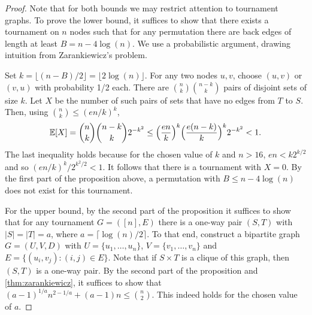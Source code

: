 \begin{proof}
    Note that for both bounds we may restrict attention to tournament graphs.
    To prove the lower bound, it suffices to show that there exists a tournament on $n$ nodes such that for any permutation there are back edges of length at least $B = n - 4\log(n)$.
    We use a probabilistic argument, drawing intuition from Zarankiewicz's problem.

    Set $k = \lfloor (n - B) / 2 \rfloor = \lfloor 2\log(n) \rfloor$.
    For any two nodes $u, v$, choose $(u, v)$ or $(v, u)$ with probability 1/2 each.
    There are $\binom{n}{k} \binom{n - k}{k}$ pairs of disjoint sets of size $k$.
    Let $X$ be the number of such pairs of sets that have no edges from $T$ to
    $S$.
    Then, using $\binom{n}{k} \le (en / k)^k$,
    \[ \mathbb{E}[X] =\binom{n}{k} \binom{n - k}{k}2^{-k^2} \le\Bigl( \frac{en}{k} \Bigr)^{k} \Bigl( \frac{e(n - k)}{k} \Bigr)^{k}2^{-k^2} < 1. \]
    The last inequality holds because for the chosen value of $k$ and $n > 16$, $en < k 2^{k / 2}$ and so $(en / k)^k / 2^{k^2 / 2} < 1$.
    It follows that there is a tournament with $X = 0$.
    By the first part of the proposition above, a permutation with $B \le n - 4\log(n)$ does not exist for this tournament.

    For the upper bound, by the second part of the proposition it suffices to show that for any tournament $G=([n],E)$ there is a one-way pair $(S,T)$ with $|S|=|T|=a$, where $a=\lceil\log(n)/2\rceil$.
    To that end, construct a bipartite graph $G = (U, V, D)$ with $U = \{u_1, \dots, u_n \}$, $V = \{ v_1, \dots, v_n \}$ and $E = \{(u_i, v_j) : (i, j)\in E \}$.
    Note that if $S \times T$ is a clique of this graph, then $(S, T)$ is a one-way pair.
    By the second part of the proposition and \cref{thm:zarankiewicz}, it suffices to show that $(a - 1)^{1 / a} n^{2 - 1 / a} + (a - 1)n \le \binom{n}{2}$.
    This indeed holds for the chosen value of $a$.
\end{proof}